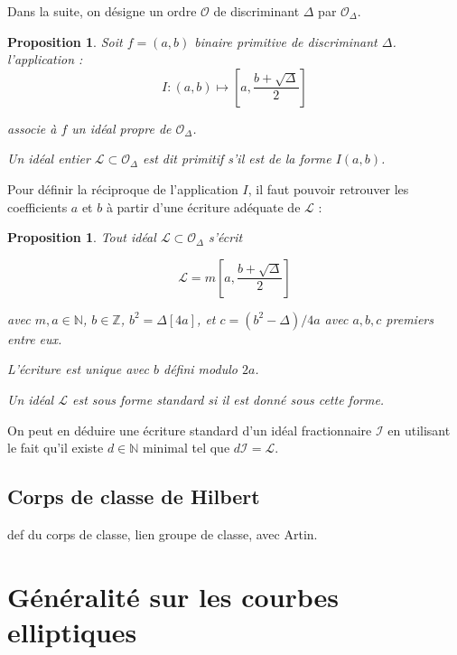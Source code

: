 \documentclass{article}
\newcommand{\N}[0]{\mathbb{N}}
\newcommand{\Z}[0]{\mathbb{Z}}
\newcommand{\OR}[0]{\mathcal{O}}
\newcommand{\LR}[0]{\mathcal{L}}
\newcommand{\IR}[0]{\mathcal{I}}
\newtheorem{Prop}[The]{Proposition}
\begin{document}
Dans la suite, on désigne un ordre $\OR$ de discriminant $\Delta$ par $\OR_{\Delta}$.

\begin{Prop}
	
	Soit $f = (a,b)$ binaire primitive de discriminant $\Delta$. l'application :
	\begin{equation*}
		I : (a,b)\mapsto\left[ a, \frac{b + \sqrt{\Delta}}{2}\right] 
	\end{equation*}
	
	associe à $f$ un idéal propre de $\OR_{\Delta}$.
	
	Un idéal entier $\LR\subset\OR_{\Delta}$ est dit primitif s'il est de la forme $I(a,b)$. 
	
\end{Prop}

Pour définir la réciproque de l'application $I$, il faut pouvoir retrouver les coefficients $a$ et $b$ à partir d'une écriture adéquate de $\LR$ :

\begin{Prop}
	
	Tout idéal $\LR\subset\OR_{\Delta}$ s'écrit 
	
	\begin{equation*}
		\LR = m\left[ a , \frac{b + \sqrt{\Delta}}{2}\right] 
	\end{equation*}
	
	avec $m,a \in\N$, $b\in\Z$, $b^{2} = \Delta [4a]$, et $c = (b^2 -\Delta)/4a$ avec $a, b, c$ premiers entre eux.
	
	L'écriture est unique avec $b$ défini modulo $2a$. 
	
	Un idéal $\LR$ est sous forme standard si il est donné sous cette forme. 
	
\end{Prop}

On peut en déduire une écriture standard d'un idéal fractionnaire $\IR$ en utilisant le fait qu'il existe $d\in\N$ minimal tel que $d\IR = \LR$. 


\subsection{Corps de classe de Hilbert}
 def du corps de classe, lien groupe de classe, avec Artin. 

\section{Généralité sur les courbes elliptiques}
\end{document}
